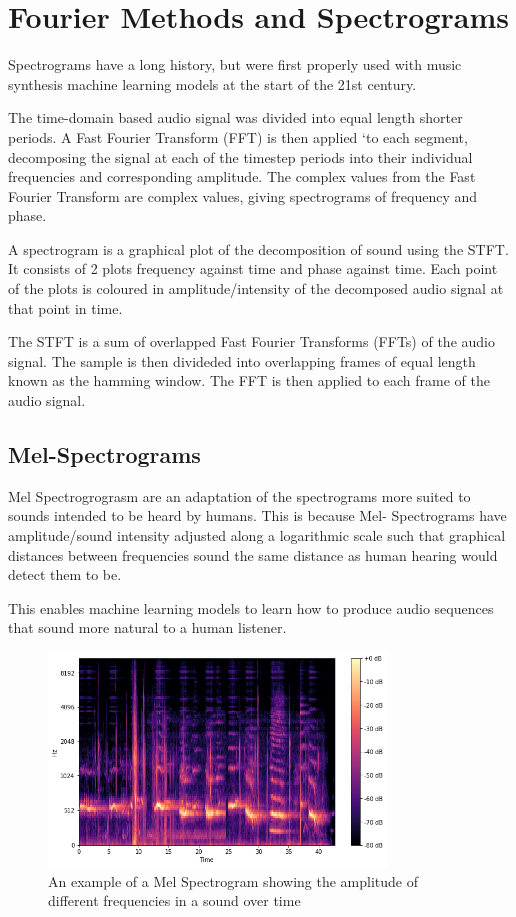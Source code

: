 \section{Fourier Methods and Spectrograms}

Spectrograms have a long history, but were first properly used with music synthesis machine learning models at the start of the 21st century\cite{NoteOnsetDetection}.

The time-domain based audio signal was divided into equal length shorter periods. A Fast Fourier Transform (FFT) is then applied `to each segment, decomposing the signal at each of the timestep periods into their individual frequencies and corresponding amplitude. The complex values from the Fast Fourier Transform are complex values, giving spectrograms of frequency and phase.

A spectrogram is a graphical plot of the decomposition of sound using the \acrfull{STFT}. It consists of 2 plots frequency against time and phase against time. Each point of the plots is coloured in amplitude/intensity of the decomposed audio signal at that point in time.

The STFT is a sum of overlapped Fast Fourier Transforms (FFTs) of the audio signal. The sample is then divideded into overlapping frames of equal length known as the hamming window. The FFT is then applied to each frame of the audio signal. 

\subsection{Mel-Spectrograms}

Mel Spectrogrograsm are an adaptation of the spectrograms more suited to  sounds intended to be heard by humans. This is because Mel- Spectrograms have amplitude/sound intensity adjusted along a logarithmic scale such that graphical distances between frequencies sound the same distance as human hearing would detect them to be.

This enables machine learning models to learn how to produce audio sequences that sound more natural to a human listener.

\begin{figure}[!ht]
    \centering
    \includegraphics[width=0.8\textwidth]{literature_review/MelSpectrogram.png}
    \caption{An example of a  Mel Spectrogram showing the amplitude of different frequencies in a sound over time\cite{GettingToKnowTheMelSpectrogram}}
    \label{fig:spectrograms}
\end{figure}

